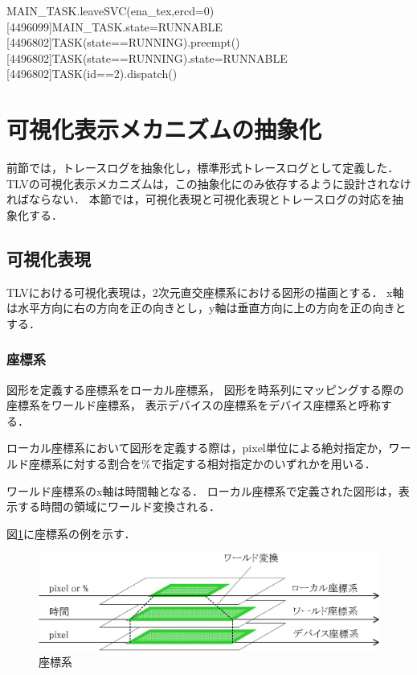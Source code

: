 \begin{EBNF}
[2403010]MAIN_TASK.leaveSVC(ena_tex,ercd=0)
[4496099]MAIN_TASK.state=RUNNABLE
[4496802]TASK(state==RUNNING).preempt()
[4496802]TASK(state==RUNNING).state=RUNNABLE
[4496802]TASK(id==2).dispatch()
\end{EBNF}

\section{可視化表示メカニズムの抽象化}

前節では，トレースログを抽象化し，標準形式トレースログとして定義した．
TLVの可視化表示メカニズムは，この抽象化にのみ依存するように設計されなければならない．
本節では，可視化表現と可視化表現とトレースログの対応を抽象化する．

\subsection{可視化表現}

TLVにおける可視化表現は，2次元直交座標系における図形の描画とする．
x軸は水平方向に右の方向を正の向きとし，y軸は垂直方向に上の方向を正の向きとする．

\subsubsection{座標系}
図形を定義する座標系をローカル座標系，
図形を時系列にマッピングする際の座標系をワールド座標系，
表示デバイスの座標系をデバイス座標系と呼称する．

ローカル座標系において図形を定義する際は，pixel単位による絶対指定か，ワールド座標系に対する割合を\%で指定する相対指定かのいずれかを用いる．

ワールド座標系のx軸は時間軸となる．
ローカル座標系で定義された図形は，表示する時間の領域にワールド変換される．

図\ref{fig:coordinate}に座標系の例を示す．

\begin{figure}[p]
\begin{center}
\includegraphics[scale=0.75]{img/coordinate.eps}
\caption{座標系}
\label{fig:coordinate}
\end{center}
\end{figure}

